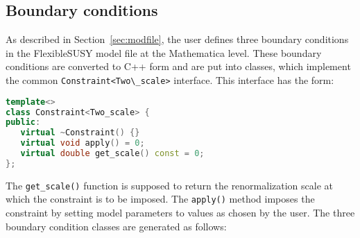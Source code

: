 \documentclass[final,3p,11pt,pdflatex]{elsarticle}
\makeatletter
\newcommand{\fs}{FlexibleSUSY\@\xspace}
\newcommand{\mathematica}{Mathematica\xspace}
\newcommand{\code}[1]{\lstinline|#1|}  %
\newcommand{\secref}[1]{Section~\ref{#1}}
\makeatother
\begin{document}
\subsection{Boundary conditions}
\label{sec:boundary-conditions}


As described in \secref{sec:modfile}, the user defines three boundary
conditions in the \fs model file at the \mathematica level.  These
boundary conditions are converted to C++ form and are put into
classes, which implement the common \code{Constraint<Two\_scale>}
interface.  This interface has the form:
%
\begin{lstlisting}[language=C++]
template<>
class Constraint<Two_scale> {
public:
   virtual ~Constraint() {}
   virtual void apply() = 0;
   virtual double get_scale() const = 0;
};
\end{lstlisting}
%
The \code{get_scale()} function is supposed to return the
renormalization scale at which the constraint is to be imposed.  The
\code{apply()} method imposes the constraint by setting model
parameters to values as chosen by the user.  The three boundary
condition classes are generated as follows:
%
\end{document}
